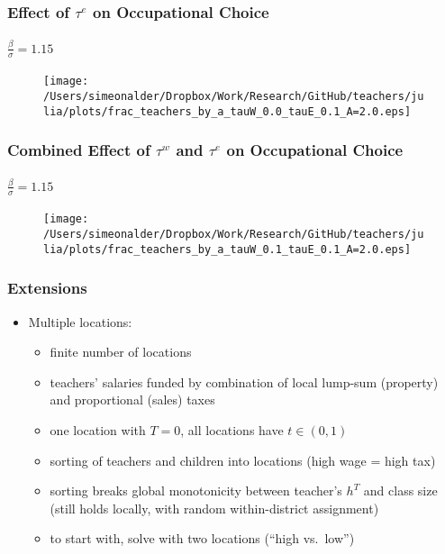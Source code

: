 \documentclass[11pt]{beamer}
\begin{document}
\begin{frame}
\frametitle{Effect of $\tau^e$ on Occupational Choice}
\framesubtitle{$\frac{\beta}{\sigma} = 1.15$}
\begin{figure}
\begin{center}
\texttt{[image: /Users/simeonalder/Dropbox/Work/Research/GitHub/teachers/julia/plots/frac\_teachers\_by\_a\_tauW\_0.0\_tauE\_0.1\_A=2.0.eps]}
\end{center}
\end{figure}
\end{frame}

\begin{frame}
\frametitle{Combined Effect of $\tau^w$ and $\tau^e$ on Occupational Choice}
\framesubtitle{$\frac{\beta}{\sigma} = 1.15$}
\begin{figure}
\begin{center}
\texttt{[image: /Users/simeonalder/Dropbox/Work/Research/GitHub/teachers/julia/plots/frac\_teachers\_by\_a\_tauW\_0.1\_tauE\_0.1\_A=2.0.eps]}
\end{center}
\end{figure}
\end{frame}

\begin{frame}
\frametitle{Extensions}
\begin{itemize}
  \item Multiple locations:
  \begin{itemize}
  \item finite number of locations
  \item teachers' salaries funded by combination of local lump-sum (property) and proportional (sales) taxes
  \item one location with $T=0$, all locations have $t \in (0,1)$
  \item sorting of teachers and children into locations (high wage = high tax)
  \item sorting breaks global monotonicity between teacher's $h^T$ and class size (still holds locally, with random within-district assignment)
  \item to start with, solve with two locations (``high vs.~low'') 
  \end{itemize}
\end{itemize}
\end{frame}
\end{document}
